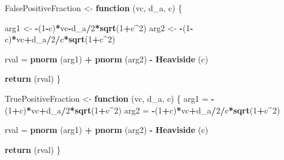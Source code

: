 \documentclass[
]{book}
\newenvironment{Shaded}{\begin{snugshade}}{\end{snugshade}}
\newcommand{\ControlFlowTok}[1]{\textcolor[rgb]{0.13,0.29,0.53}{\textbf{#1}}}
\newcommand{\DecValTok}[1]{\textcolor[rgb]{0.00,0.00,0.81}{#1}}
\newcommand{\KeywordTok}[1]{\textcolor[rgb]{0.13,0.29,0.53}{\textbf{#1}}}
\newcommand{\NormalTok}[1]{#1}
\newcommand{\OperatorTok}[1]{\textcolor[rgb]{0.81,0.36,0.00}{\textbf{#1}}}
\newcommand{\StringTok}[1]{\textcolor[rgb]{0.31,0.60,0.02}{#1}}
\begin{document}
\begin{Shaded}
\begin{Highlighting}[]
\NormalTok{FalsePositiveFraction <-}\StringTok{ }\ControlFlowTok{function}\NormalTok{ (vc, d_a, c)}
\NormalTok{\{}
  
\NormalTok{  arg1 <-}\StringTok{  }\OperatorTok{-}\NormalTok{(}\DecValTok{1}\OperatorTok{-}\NormalTok{c)}\OperatorTok{*}\NormalTok{vc}\OperatorTok{-}\NormalTok{d_a}\OperatorTok{/}\DecValTok{2}\OperatorTok{*}\KeywordTok{sqrt}\NormalTok{(}\DecValTok{1}\OperatorTok{+}\NormalTok{c}\OperatorTok{^}\DecValTok{2}\NormalTok{)}
\NormalTok{  arg2 <-}\StringTok{  }\OperatorTok{-}\NormalTok{(}\DecValTok{1}\OperatorTok{-}\NormalTok{c)}\OperatorTok{*}\NormalTok{vc}\OperatorTok{+}\NormalTok{d_a}\OperatorTok{/}\DecValTok{2}\OperatorTok{/}\NormalTok{c}\OperatorTok{*}\KeywordTok{sqrt}\NormalTok{(}\DecValTok{1}\OperatorTok{+}\NormalTok{c}\OperatorTok{^}\DecValTok{2}\NormalTok{)}
  
\NormalTok{  rval =}\StringTok{ }\KeywordTok{pnorm}\NormalTok{ (arg1) }\OperatorTok{+}\StringTok{ }\KeywordTok{pnorm}\NormalTok{ (arg2) }\OperatorTok{-}\StringTok{ }\KeywordTok{Heaviside}\NormalTok{ (c)}
  
  \KeywordTok{return}\NormalTok{ (rval)}
\NormalTok{\}}



\NormalTok{TruePositiveFraction <-}\StringTok{ }\ControlFlowTok{function}\NormalTok{ (vc, d_a, c)}
\NormalTok{\{}
\NormalTok{  arg1 =}\StringTok{ }\OperatorTok{-}\NormalTok{(}\DecValTok{1}\OperatorTok{+}\NormalTok{c)}\OperatorTok{*}\NormalTok{vc}\OperatorTok{+}\NormalTok{d_a}\OperatorTok{/}\DecValTok{2}\OperatorTok{*}\KeywordTok{sqrt}\NormalTok{(}\DecValTok{1}\OperatorTok{+}\NormalTok{c}\OperatorTok{^}\DecValTok{2}\NormalTok{)}
\NormalTok{  arg2 =}\StringTok{ }\OperatorTok{-}\NormalTok{(}\DecValTok{1}\OperatorTok{+}\NormalTok{c)}\OperatorTok{*}\NormalTok{vc}\OperatorTok{+}\NormalTok{d_a}\OperatorTok{/}\DecValTok{2}\OperatorTok{/}\NormalTok{c}\OperatorTok{*}\KeywordTok{sqrt}\NormalTok{(}\DecValTok{1}\OperatorTok{+}\NormalTok{c}\OperatorTok{^}\DecValTok{2}\NormalTok{)}
  
\NormalTok{  rval =}\StringTok{ }\KeywordTok{pnorm}\NormalTok{ (arg1) }\OperatorTok{+}\StringTok{ }\KeywordTok{pnorm}\NormalTok{ (arg2) }\OperatorTok{-}\StringTok{ }\KeywordTok{Heaviside}\NormalTok{ (c)}
  
  \KeywordTok{return}\NormalTok{ (rval)}
\NormalTok{\}}
\end{Highlighting}
\end{Shaded}
\end{document}
